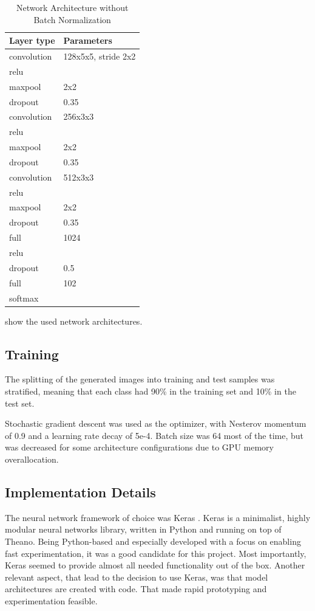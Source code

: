 \documentclass[a4paper, 11pt]{article}
\begin{document}
\begin{table}[!h]
	\begin{center}
		\begin{tabularx}{.5\linewidth}{|X|l|}
			\hline \textbf{Layer type} & \textbf{Parameters} \\ 
			\hline convolution & 128x5x5, stride 2x2 \\ 
			\hline relu &\\
			\hline maxpool &  2x2\\ 
			\hline dropout & 0.35 \\
			\hline convolution & 256x3x3 \\ 
			\hline relu &\\
			\hline maxpool &  2x2\\ 
			\hline dropout & 0.35 \\
			\hline convolution & 512x3x3 \\ 
			\hline relu &\\
			\hline maxpool &  2x2\\ 
			\hline dropout & 0.35 \\
			\hline full &  1024 \\ 
			\hline relu &\\
			\hline dropout & 0.5 \\
			\hline full &  102 \\
			\hline softmax & \\
			\hline
		\end{tabularx}
	\end{center}
	\caption{Network Architecture without Batch Normalization}
	\label{tab:no-bn-arch}
\end{table}

 show the used network architectures.

\subsection{Training}
The splitting of the generated images into training and test samples was stratified, meaning that each class had 90\% in the training set and 10\% in the test set.

Stochastic gradient descent was used as the optimizer, with Nesterov momentum of 0.9 and a learning rate decay of 5e-4.
Batch size was 64 most of the time, but was decreased for some architecture configurations due to GPU memory overallocation.

\subsection{Implementation Details}
The neural network framework of choice was Keras \cite{keras}.
Keras is a minimalist, highly modular neural networks library, written in Python and running on top of Theano.
Being Python-based and especially developed with a focus on enabling fast experimentation, it was a good candidate for this project.
Most importantly, Keras seemed to provide almost all needed functionality out of the box.
Another relevant aspect, that lead to the decision to use Keras, was that model architectures are created with code.
That made rapid prototyping and experimentation feasible.\\
\end{document}
